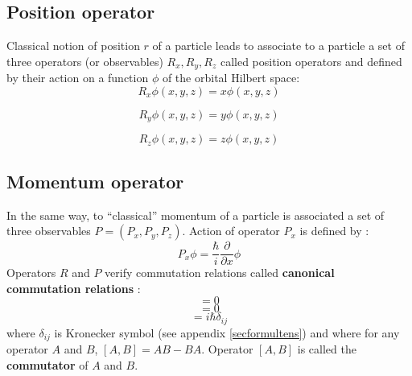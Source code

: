 \documentclass[12pt]{book}
\begin{document}
\subsection{Position operator}
Classical notion of position $r$ of a particle leads to associate to a
particle a set of three operators (or observables)
$R_x,R_y,R_z$ called position operators and
defined by their action on a function $\phi$ of the orbital Hilbert space:
\begin{equation}
R_x\phi(x,y,z)=x\phi(x,y,z)
\end{equation}

\begin{equation}
R_y\phi(x,y,z)=y\phi(x,y,z)
\end{equation}

\begin{equation}
R_z\phi(x,y,z)=z\phi(x,y,z)
\end{equation}

\subsection{Momentum operator}
In the same way, to ``classical'' momentum of a particle is
associated a set of three observables $P=(P_x,P_y,P_z)$. Action of operator
$P_x$ is defined by :
\begin{equation}\label{eqdefmomP}
P_x\phi=\frac{\hbar}{i}\frac{\partial}{\partial x} \phi
\end{equation}
Operators $R$ and $P$ verify commutation relations called
{\bf canonical commutation relations} :
\begin{equation}
[R_i,R_j]=0
\end{equation}
\begin{equation}
[P_i,P_j]=0
\end{equation}
\begin{equation}
[R_i,P_j]=i\hbar \delta_{ij}
\end{equation}
where $\delta_{ij}$ is Kronecker symbol (see appendix
\ref{secformultens}) and where for any operator $A$ and $B$,
$[A,B]=AB-BA$. Operator $[A,B]$ is called the {\bf commutator} of $A$
and $B$.
\end{document}
